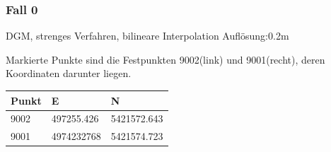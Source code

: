 \documentclass[12pt]{article}
\begin{document}
\subsubsection{Fall 0}
DGM, strenges Verfahren, bilineare Interpolation Auflösung:0.2m \newline
\begin{figure}[ht]\centering
\end{figure}
\newline
Markierte Punkte sind die Festpunkten 9002(link) und 9001(recht), deren Koordinaten darunter liegen.
\begin{table}[ht] \centering
	\begin{tabular}{|l|l|l|}
		\hline
		Punkt & E          & N           \\ \hline
		9002  & 497255.426 & 5421572.643 \\ \hline
		9001  & 4974232768 & 5421574.723 \\ \hline
	\end{tabular}
\end{table}
\newpage
\end{document}

